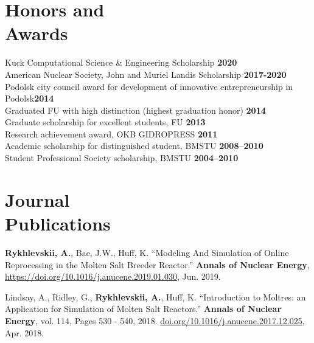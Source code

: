 \documentclass[margin,line]{resume}
\newcommand{\Cyclus}{\textsc{Cyclus}\xspace}%
\begin{document}
\begin{resume}
    \section{\mysidestyle Honors and\\Awards}
        Kuck Computational Science \& Engineering Scholarship\hfill 
        \textbf{2020}\vspace{.5mm}\\%
        American Nuclear Society, John and Muriel Landis Scholarship\hfill 
        \textbf{2017-2020}\vspace{.5mm}\\%
		Podolsk city council award for development of innovative entrepreneurship in Podolsk\hfill \textbf{2014}\vspace{.5mm}\\%
		Graduated FU with high distinction (highest graduation honor)                \hfill \textbf{2014}\vspace{.5mm}\\%
		Graduate scholarship for excellent students, 
		FU                       	\hfill \textbf{2013}\vspace{.5mm}\\%
		Research achievement award, OKB GIDROPRESS                                   \hfill\textbf{2011}\vspace{.5mm}\\%
		Academic scholarship for distinguished student, BMSTU		                 \hfill\textbf{2008--2010}\vspace{.5mm}\\%
		Student Professional Society scholarship, 
		BMSTU                                \hfill\textbf{2004--2010}%
 
    \section{\mysidestyle Journal\\Publications}
      \begin{bibenum}
	    \item \textbf{Rykhlevskii, A.}, Bae, J.W., Huff, K. ``Modeling And 
	    Simulation of Online Reprocessing in the Molten Salt Breeder 
	    Reactor.'' \textbf{Annals of Nuclear Energy}, 
               \url{https://doi.org/10.1016/j.anucene.2019.01.030}, 
               Jun. 2019.
       \item Lindsay, A., Ridley, G., \textbf{Rykhlevskii, A.}, Huff, K. ``Introduction to 
               Moltres: an Application for Simulation of Molten Salt 
               Reactors.''  \textbf{Annals of Nuclear Energy}, vol. 114, Pages 530 - 540, 2018. \url{doi.org/10.1016/j.anucene.2017.12.025}, Apr. 2018.
      \end{bibenum}
\vspace{2mm} %

\end{resume}
\end{document}
